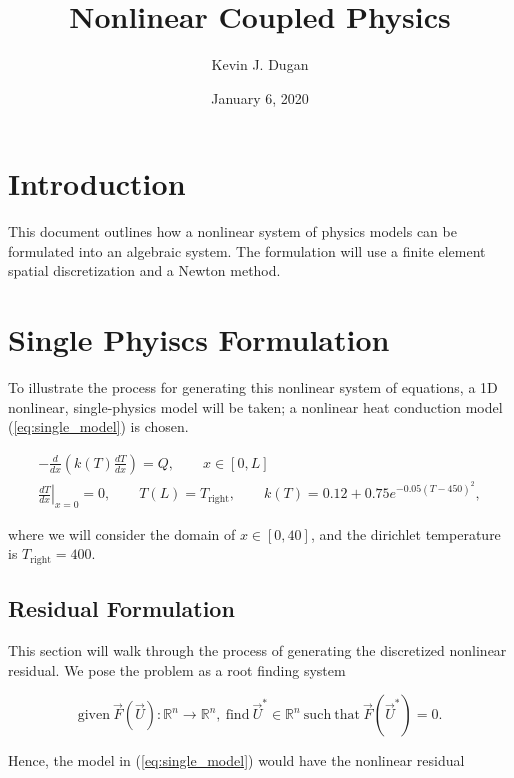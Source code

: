 \documentclass[11pt]{style/memo}
\title{Nonlinear Coupled Physics}
\author{Kevin J. Dugan}
\date{January 6, 2020}
\begin{document}
\maketitle

\section{Introduction}
This document outlines how a nonlinear system of physics models can be formulated into
an algebraic system. The formulation will use a finite element spatial discretization and a
Newton method.

\section{Single Phyiscs Formulation}
To illustrate the process for generating this nonlinear system of equations, a 1D nonlinear, 
single-physics model will be taken; a nonlinear heat conduction model (\ref{eq:single_model}) is
chosen.

\begin{equation}
    \label{eq:single_model}
    \begin{gathered}
    -\frac{d}{dx} \left( k(T) \frac{dT}{dx} \right) = Q,     \qquad x \in [0,L] \\
    \left. \frac{dT}{dx} \right|_{x=0} = 0,                  \qquad T(L) = T_\mathrm{right},  \qquad k(T) = 0.12 + 0.75 e^{-0.05{\left(T-450 \right)}^2},
    \end{gathered}
\end{equation}
\vspace{1em}

where we will consider the domain of ${x\in[0, 40]}$, and the dirichlet temperature is
$T_\mathrm{right} = 400$.

\subsection{Residual Formulation}
This section will walk through the process of generating the discretized nonlinear residual. We pose
the problem as a root finding system

\begin{equation*}
    \mathrm{given} \ \vec{F}(\vec{U}):\mathbb{R}^n \rightarrow \mathbb{R}^n,
    \ \mathrm{find} \ \vec{U}^\ast \in \mathbb{R}^n \ \mathrm{such \ that}
    \ \vec{F}(\vec{U}^\ast) = 0.
\end{equation*}

Hence, the model in (\ref{eq:single_model}) would have the nonlinear residual
\end{document}
